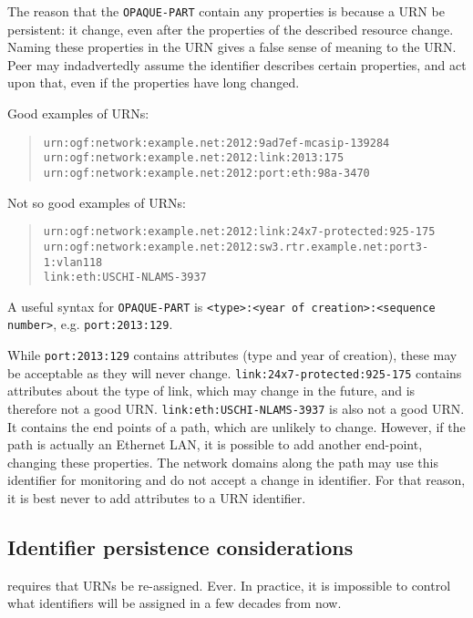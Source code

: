 \documentclass[12pt]{article}  %
\begin{document}
The reason that the \texttt{OPAQUE-PART} \SHOULDNOT{} contain any properties 
is because a URN \MUST{} be persistent: it \MUSTNOT{} change, even after the 
properties of the described resource change.
Naming these properties in the URN gives a false sense of meaning to the URN. 
Peer may indadvertedly assume the identifier describes certain 
properties, and act upon that, even if the properties have long changed.

Good examples of URNs:
\begin{quote}
\texttt{urn:ogf:network:example.net:2012:9ad7ef-mcasip-139284} \\
\texttt{urn:ogf:network:example.net:2012:link:2013:175} \\
\texttt{urn:ogf:network:example.net:2012:port:eth:98a-3470}
\end{quote}

Not so good examples of URNs:
\begin{quote}
\texttt{urn:ogf:network:example.net:2012:link:24x7-protected:925-175} \\
\texttt{urn:ogf:network:example.net:2012:sw3.rtr.example.net:port3-1:vlan118} \\
\texttt{link:eth:US\underscore{}CHI-NL\underscore{}AMS-3937}
\end{quote}

A useful syntax for \texttt{OPAQUE-PART} is 
\texttt{<type>:<year of creation>:<sequence number>}, 
e.g. \texttt{port:2013:129}.

While \texttt{port:2013:129} contains attributes (type and year of 
creation), these may be acceptable as they will never change. 
\texttt{link:24x7-protected:925-175} contains attributes about the type of link, 
which may change in the future, and is therefore not a good URN. 
\texttt{link:eth:US\underscore{}CHI-NL\underscore{}AMS-3937} is also not a good URN. 
It contains the end points of a path, which are unlikely to change. 
However, if the path is actually an Ethernet LAN, it is possible to add 
another end-point, changing these properties. The network domains along 
the path may use this identifier for monitoring and do not accept a 
change in identifier. For that reason, it is best never to add attributes 
to a URN identifier.

\subsection{Identifier persistence considerations}
\label{sec:persistence}

\cite{rfc3406} requires that URNs \MUSTNOT{} be re-assigned. Ever.
In practice, it is impossible to control what identifiers will be assigned 
in a few decades from now.
\end{document}
